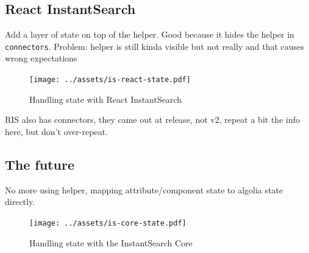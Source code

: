 
\subsection{React InstantSearch} %
\label{sub:react_instantearch}

Add a layer of state on top of the helper. Good because it hides the helper in {\tt connectors}. Problem: helper is still kinda visible but not really and that causes wrong expectations %

\begin{figure}[H]
\label{figure:is-react-state}
  \centering
  \texttt{[image: ../assets/is-react-state.pdf]}
  \caption{Handling state with React InstantSearch}
\end{figure}

RIS also has connectors, they came out at release, not v2, repeat a bit the info here, but don't over-repeat. %


\subsection{The future} %
\label{sub:the_future}

No more using helper, mapping attribute/component state to algolia state directly. %

\begin{figure}[H]
\label{figure:is-core-state}
  \centering
  \texttt{[image: ../assets/is-core-state.pdf]}
  \caption{Handling state with the InstantSearch Core}
\end{figure}


